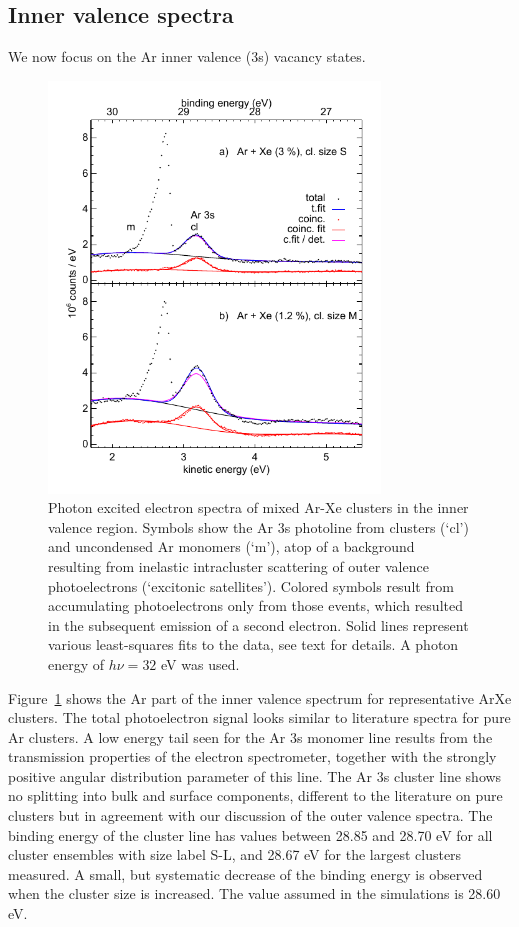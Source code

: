 \subsection{Inner valence spectra}
%
We now focus on the Ar inner valence (3s) vacancy states. 
%
\begin{figure}[ht]
 \centering
 \includegraphics[width=8.8cm]{pics/figure_ival.pdf}
 \caption{
Photon excited electron spectra of mixed Ar-Xe clusters in the inner valence region.
Symbols show the Ar 3s photoline from clusters (`cl') and uncondensed Ar monomers (`m'), atop of a background resulting from inelastic intracluster scattering of outer valence photoelectrons (`excitonic satellites'\protect\cite{hergenhahn2002}).
Colored symbols result from accumulating photoelectrons only from those events, which resulted in the subsequent emission of a second electron.
Solid lines represent various least-squares fits to the data, see text for details.
A photon energy of $h\nu = 32$ eV was used.
 \label{figure:ival}
 }
\end{figure}

Figure\ \ref{figure:ival} shows the Ar part of the inner valence spectrum for representative ArXe clusters. 
The total photoelectron signal looks similar to literature spectra for pure Ar clusters.\cite{feifel,zhang} 
A low energy tail seen for the Ar 3s monomer line results from the transmission properties of the electron spectrometer, together with the strongly positive angular distribution parameter of this line.\cite{kruit}
The Ar 3s cluster line shows no splitting into bulk and surface components, different to the literature on pure clusters but in agreement with our discussion of the outer valence spectra. 
The binding energy of the cluster line has values between 28.85 and 28.70 eV for all cluster ensembles with size label S-L, and 28.67 eV for the largest clusters measured. 
A small, but systematic decrease of the binding energy is observed when the cluster size is increased. 
The value assumed in the simulations is 28.60 eV.\cite{Fasshauer13}

